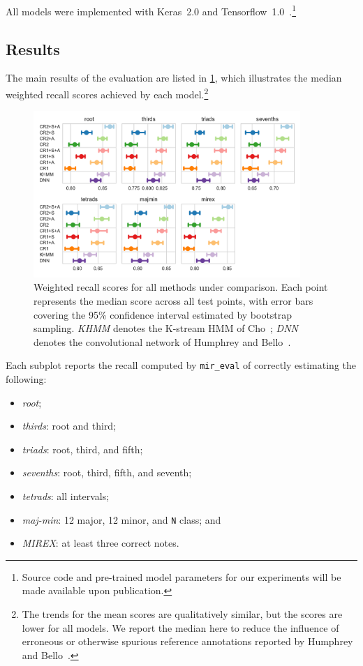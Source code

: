 \documentclass{article}
\begin{document}
All models were implemented with Keras~2.0 and Tensorflow~1.0~\cite{chollet2015keras, tensorflow2015-whitepaper}.\footnote{Source code and pre-trained model parameters for our experiments will be made available upon publication.}

\subsection{Results}

The main results of the evaluation are listed in \cref{fig:results}, which illustrates the median weighted recall scores achieved by each model.\footnote{The trends for the mean scores are qualitatively similar, but the scores are lower for all models. We report the median here to reduce the influence of erroneous or otherwise spurious reference annotations reported by Humphrey and Bello~\cite{humphrey2015four}.}
\begin{figure}[t]
    \centering
    \includegraphics[width=0.9\textwidth]{crnn-scores}
    \caption{Weighted recall scores for all methods under comparison.  Each point represents the median score across all test points, with error bars covering the 95\% confidence interval estimated by bootstrap sampling.
        \emph{KHMM} denotes the K-stream HMM of Cho~\cite{cho2014improved}; \emph{DNN} denotes the convolutional network of Humphrey and Bello~\cite{humphrey2015four}.\label{fig:results}}
\end{figure}
Each subplot reports the recall computed by \texttt{mir\_eval} of correctly estimating the following:
\begin{itemize}
    \item \emph{root};
    \item \emph{thirds}: root and third;
    \item \emph{triads}: root, third, and fifth;
    \item \emph{sevenths}: root, third, fifth, and seventh;
    \item \emph{tetrads}: all intervals;
    \item \emph{maj-min}: 12 major, 12 minor, and \texttt{N} class; and
    \item \emph{MIREX}: at least three correct notes.
\end{itemize}
\end{document}
